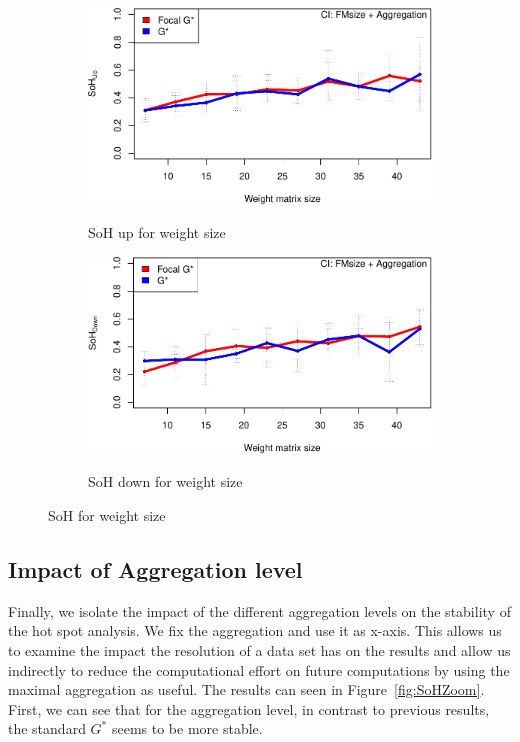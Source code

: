 \documentclass{itatnew}
\begin{document}
\begin{figure}[htp]
  \begin{subfigure}{\linewidth}
    \caption{SoH up for weight size}
    \includegraphics[width=\linewidth]{images/gen-weight-1}
    \label{fig:wUp}
  \end{subfigure}
  \hspace{1em}
  \begin{subfigure}{\linewidth}
    \caption{SoH down for weight size}
    \includegraphics[width=\linewidth]{images/gen-weight-2}
    \label{fig:wDown}
  \end{subfigure}
  \caption{SoH for weight size}
  \label{fig:SoHWeight}
\end{figure}
%
%
\subsection{Impact of Aggregation level}
Finally, we isolate the impact of the different aggregation levels on the stability of the hot spot analysis. 
We fix the aggregation and use it as x-axis. This allows us to examine the impact
the resolution of a data set has on the results and allow us indirectly to reduce the 
computational effort on future computations by using the maximal aggregation as useful.
The results can seen in Figure~\ref{fig:SoHZoom}.
First, we can see that for the aggregation level, in contrast to previous 
results, the standard $G^*$ seems to be more stable.
\end{document}
